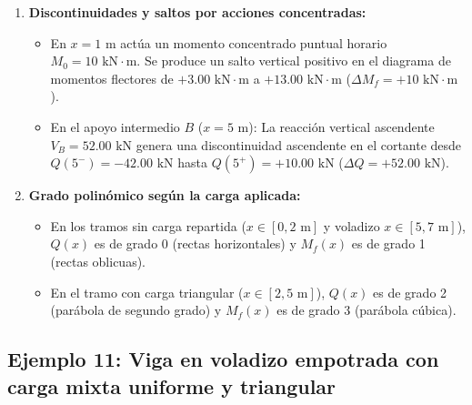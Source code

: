 {\begin{enumerate}
\begin{itemize}
              \end{itemize}



        \item \textbf{Discontinuidades y saltos por acciones concentradas:}

              \begin{itemize}

                  \item En $x = 1\text{ m}$ actúa un momento concentrado puntual horario $M_0 = 10\text{ kN}\cdot\text{m}$. Se produce un salto vertical positivo en el diagrama de momentos flectores de $+3.00\text{ kN}\cdot\text{m}$ a $+13.00\text{ kN}\cdot\text{m}$ ($\Delta M_f = +10\text{ kN}\cdot\text{m}$).

                  \item En el apoyo intermedio $B$ ($x = 5\text{ m}$): La reacción vertical ascendente $V_B = 52.00\text{ kN}$ genera una discontinuidad ascendente en el cortante desde $Q(5^-) = -42.00\text{ kN}$ hasta $Q(5^+) = +10.00\text{ kN}$ ($\Delta Q = +52.00\text{ kN}$).

              \end{itemize}



        \item \textbf{Grado polinómico según la carga aplicada:}

              \begin{itemize}

                  \item En los tramos sin carga repartida ($x \in [0, 2\text{ m}]$ y voladizo $x \in [5, 7\text{ m}]$), $Q(x)$ es de grado 0 (rectas horizontales) y $M_f(x)$ es de grado 1 (rectas oblicuas).

                  \item En el tramo con carga triangular ($x \in [2, 5\text{ m}]$), $Q(x)$ es de grado 2 (parábola de segundo grado) y $M_f(x)$ es de grado 3 (parábola cúbica).

              \end{itemize}

    \end{enumerate}

}





\subsection{Ejemplo 11: Viga en voladizo empotrada con carga mixta uniforme y triangular}



